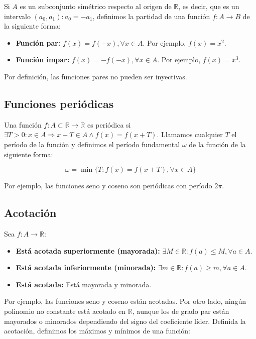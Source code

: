 Si $A$ es un subconjunto simétrico respecto al origen de $\mathbb{R}$, es decir, que es un intervalo $(a_0,a_1) : a_0 = -a_1$, definimos la partidad de una función $f : A \rightarrow B$ de la siguiente forma:

\begin{itemize}
	\item\textbf{Función par:}
		$f(x) = f(-x), \forall x \in A$. Por ejemplo, $f(x) = x^2$.
	\item\textbf{Función impar:}
		$f(x) = -f(-x), \forall x \in A$. Por ejemplo, $f(x) = x^3$.
\end{itemize}

Por definición, las funciones pares no pueden ser inyectivas.

\subsection{Funciones periódicas}

Una función $f : A \subset \mathbb{R} \rightarrow \mathbb{R}$ es periódica si $\exists T > 0 : x \in A \Rightarrow x + T \in A \land f(x) = f(x+T)$.
Llamamos cualquier $T$ el período de la función y definimos el período fundamental $\omega$ de la función de la siguiente forma:

\[\omega = \min\{T : f(x) = f(x+T), \forall x \in A\}\]

Por ejemplo, las funciones seno y coseno son periódicas con período $2\pi$.

\subsection{Acotación}

Sea $f : A \rightarrow \mathbb{R}$:

\begin{itemize}
	\item\textbf{Está acotada superiormente (mayorada):}
		$\exists M \in\mathbb{R} : f(a) \leq M, \forall a \in A$.
	\item\textbf{Está acotada inferiormente (minorada):}
		$\exists m \in\mathbb{R} : f(a) \geq m, \forall a \in A$.
	\item\textbf{Está acotada:}
		Está mayorada y minorada.
\end{itemize}

Por ejemplo, las funciones seno y coseno están acotadas.
Por otro lado, ningún polinomio no constante está acotado en $\mathbb{R}$, aunque los de grado par están mayorados o minorados dependiendo del signo del coeficiente líder.
Definida la acotación, definimos los máximos y mínimos de una función:

